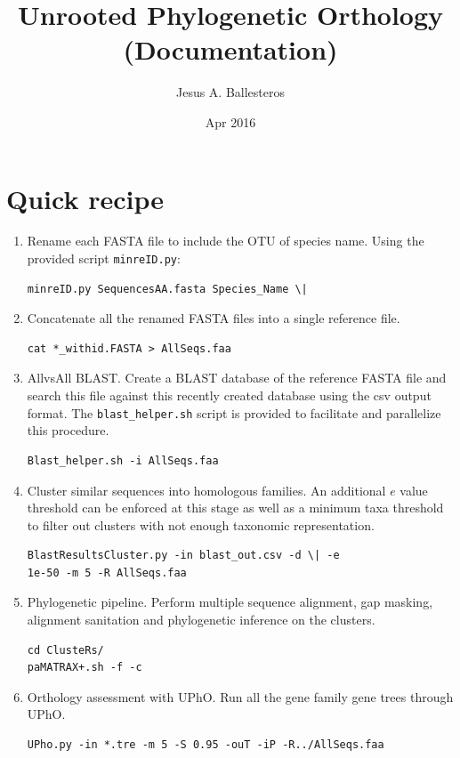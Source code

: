 \documentclass[10pt]{article}
\title{
  {\Huge\color{red}U}nrooted 
  {\Huge\color{red}Ph}ylogenetic 
  {\Huge\color{red}O}rthology
\\(Documentation)
}
\author{Jesus A. Ballesteros}
\date{Apr 2016}
\begin{document}
\maketitle
\section{Quick recipe}
\begin{enumerate}
\item Rename each FASTA file to include the OTU of species name. Using
the provided script \texttt{minreID.py}:
  \begin{verbatim} 
minreID.py SequencesAA.fasta Species_Name \|
  \end{verbatim}
\item Concatenate all the renamed FASTA files into a single reference
file.
  \begin{verbatim} 
cat *_withid.FASTA > AllSeqs.faa
  \end{verbatim}
\item AllvsAll BLAST. Create a BLAST database of the reference FASTA
file and search this file against this recently created database using
the csv output format. The \texttt{blast\_helper.sh} script is
provided to facilitate and parallelize this procedure.
  \begin{verbatim} 
Blast_helper.sh -i AllSeqs.faa
  \end{verbatim}
\item Cluster similar sequences into homologous families. An
additional $e$ value threshold can be enforced at this stage as well
as a minimum taxa threshold to filter out clusters with not enough
taxonomic representation.
  \begin{verbatim} 
BlastResultsCluster.py -in blast_out.csv -d \| -e
1e-50 -m 5 -R AllSeqs.faa
  \end{verbatim}
\item Phylogenetic pipeline. Perform multiple sequence alignment, gap
masking, alignment sanitation and phylogenetic inference on the
clusters.
  \begin{verbatim} 
cd ClusteRs/ 
paMATRAX+.sh -f -c
  \end{verbatim}
\item Orthology assessment with UPhO. Run all the gene family gene
trees through UPhO.
  \begin{verbatim} 
UPho.py -in *.tre -m 5 -S 0.95 -ouT -iP -R../AllSeqs.faa
  \end{verbatim}
\end{enumerate}
\end{document}
